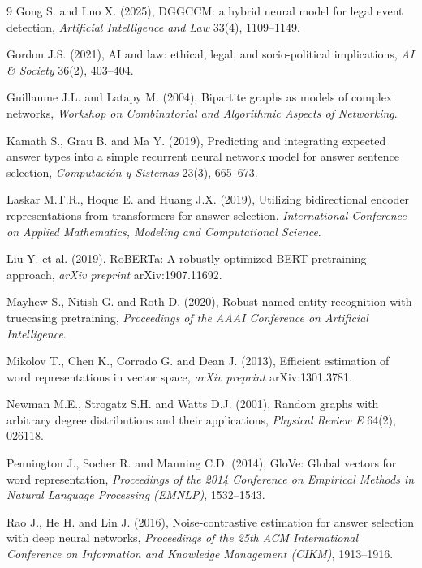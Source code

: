 \documentclass[twoside]{article}
\begin{document}
\begin{thebibliography}{9}
Gong S. and Luo X. (2025), DGGCCM: a hybrid neural model for legal event detection, {\it Artificial Intelligence and Law} 33(4), 1109--1149.

Gordon J.S. (2021), AI and law: ethical, legal, and socio-political implications, {\it AI \& Society} 36(2), 403--404.

Guillaume J.L. and Latapy M. (2004), Bipartite graphs as models of complex networks, {\it Workshop on Combinatorial and Algorithmic Aspects of Networking}.
	
Kamath S., Grau B. and Ma Y. (2019), Predicting and integrating expected answer types into a simple recurrent neural network model for answer sentence selection, {\it Computaci\'{o}n y Sistemas} 23(3), 665--673.

Laskar M.T.R., Hoque E. and Huang J.X. (2019), Utilizing bidirectional encoder representations from transformers for answer selection, {\it International Conference on Applied Mathematics, Modeling and Computational Science}.

Liu Y. et al. (2019), RoBERTa: A robustly optimized BERT pretraining approach, {\it arXiv preprint} arXiv:1907.11692.

Mayhew S., Nitish G. and Roth D. (2020), Robust named entity recognition with truecasing pretraining, {\it Proceedings of the AAAI Conference on Artificial Intelligence}.

Mikolov T., Chen K., Corrado G. and Dean J. (2013), Efficient estimation of word representations in vector space, {\it arXiv preprint} arXiv:1301.3781.

Newman M.E., Strogatz S.H. and Watts D.J. (2001), Random graphs with arbitrary degree distributions and their applications, {\it Physical Review E} 64(2), 026118.

Pennington J., Socher R. and Manning C.D. (2014), GloVe: Global vectors for word representation, {\it Proceedings of the 2014 Conference on Empirical Methods in Natural Language Processing (EMNLP)}, 1532--1543.

Rao J., He H. and Lin J. (2016), Noise-contrastive estimation for answer selection with deep neural networks, {\it Proceedings of the 25th ACM International Conference on Information and Knowledge Management (CIKM)}, 1913--1916.


\end{thebibliography}
\end{document}
